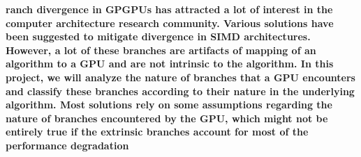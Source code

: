 
\textbf{ranch divergence in GPGPUs has attracted a lot of interest in the computer architecture research community. Various solutions have been suggested to mitigate divergence in SIMD architectures. However, a lot of these branches are artifacts of mapping of an algorithm to a GPU and are not intrinsic to the algorithm. In this project, we will analyze the nature of branches that a GPU encounters and classify these branches according to their nature in the underlying algorithm. Most solutions rely on some assumptions regarding the nature of branches encountered by the GPU, which might not be entirely true if the extrinsic branches account for most of the performance degradation} 


